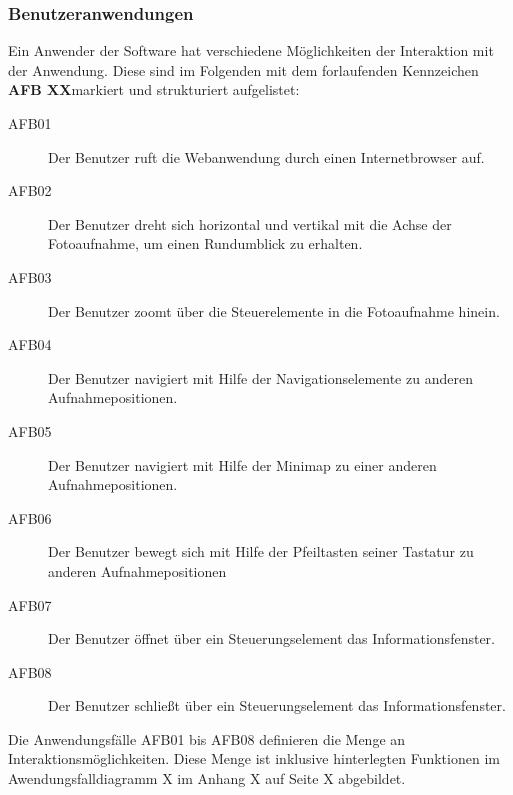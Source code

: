 \subsubsection{Benutzeranwendungen}
\label{sec:Benutzeranwendungen}

Ein Anwender der Software hat verschiedene Möglichkeiten der Interaktion mit der Anwendung. Diese sind im Folgenden mit dem forlaufenden Kennzeichen \textbf{AFB XX}\footnotemark markiert und strukturiert aufgelistet:


\begin{description}
  \item[AFB01] Der Benutzer ruft die Webanwendung durch einen Internetbrowser auf.
  \item[AFB02] Der Benutzer dreht sich horizontal und vertikal mit die Achse der Fotoaufnahme, um einen Rundumblick zu erhalten.
  \item[AFB03] Der Benutzer zoomt über die Steuerelemente in die Fotoaufnahme hinein.
  \item[AFB04] Der Benutzer navigiert mit Hilfe der Navigationselemente zu anderen Aufnahmepositionen.
  \item[AFB05] Der Benutzer navigiert mit Hilfe der Minimap zu einer anderen Aufnahmepositionen.
  \item[AFB06] Der Benutzer bewegt sich mit Hilfe der Pfeiltasten seiner Tastatur zu anderen Aufnahmepositionen
  \item[AFB07] Der Benutzer öffnet über ein Steuerungselement das Informationsfenster.
  \item[AFB08] Der Benutzer schließt über ein Steuerungselement das Informationsfenster.
\end{description}

Die Anwendungsfälle AFB01 bis AFB08 definieren die Menge an Interaktionsmöglichkeiten. Diese Menge ist inklusive hinterlegten Funktionen im Awendungsfalldiagramm X im Anhang X auf Seite X abgebildet.